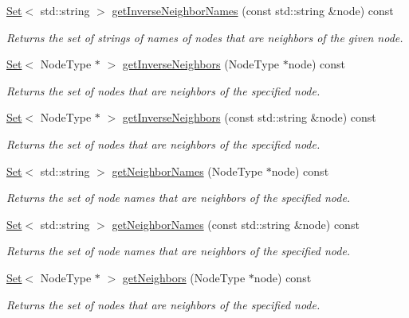 \begin{DoxyCompactItemize}
\mbox{\hyperlink{classSet}{Set}}$<$ std\+::string $>$ \mbox{\hyperlink{classGraph_ac3dc36bc1eb0f249180cfe78bce6e7a2}{get\+Inverse\+Neighbor\+Names}} (const std\+::string \&node) const
\begin{DoxyCompactList}\small\item\em Returns the set of strings of names of nodes that are neighbors of the given node. \end{DoxyCompactList}\item 
\mbox{\hyperlink{classSet}{Set}}$<$ Node\+Type $\ast$ $>$ \mbox{\hyperlink{classGraph_a80a5724c594b9bd0b6008c57b09af317}{get\+Inverse\+Neighbors}} (Node\+Type $\ast$node) const
\begin{DoxyCompactList}\small\item\em Returns the set of nodes that are neighbors of the specified node. \end{DoxyCompactList}\item 
\mbox{\hyperlink{classSet}{Set}}$<$ Node\+Type $\ast$ $>$ \mbox{\hyperlink{classGraph_a5294846b9cdd19394808e3736ec67004}{get\+Inverse\+Neighbors}} (const std\+::string \&node) const
\begin{DoxyCompactList}\small\item\em Returns the set of nodes that are neighbors of the specified node. \end{DoxyCompactList}\item 
\mbox{\hyperlink{classSet}{Set}}$<$ std\+::string $>$ \mbox{\hyperlink{classGraph_ae9b5cbd2bcb3918c4c64b1eb71c1a3a8}{get\+Neighbor\+Names}} (Node\+Type $\ast$node) const
\begin{DoxyCompactList}\small\item\em Returns the set of node names that are neighbors of the specified node. \end{DoxyCompactList}\item 
\mbox{\hyperlink{classSet}{Set}}$<$ std\+::string $>$ \mbox{\hyperlink{classGraph_a6175b4d672266465dd34e070c7710b34}{get\+Neighbor\+Names}} (const std\+::string \&node) const
\begin{DoxyCompactList}\small\item\em Returns the set of node names that are neighbors of the specified node. \end{DoxyCompactList}\item 
\mbox{\hyperlink{classSet}{Set}}$<$ Node\+Type $\ast$ $>$ \mbox{\hyperlink{classGraph_a0e49b167f0623a8ae76040c3e5eab3fb}{get\+Neighbors}} (Node\+Type $\ast$node) const
\begin{DoxyCompactList}\small\item\em Returns the set of nodes that are neighbors of the specified node. \end{DoxyCompactList}\item 

\end{DoxyCompactItemize}
